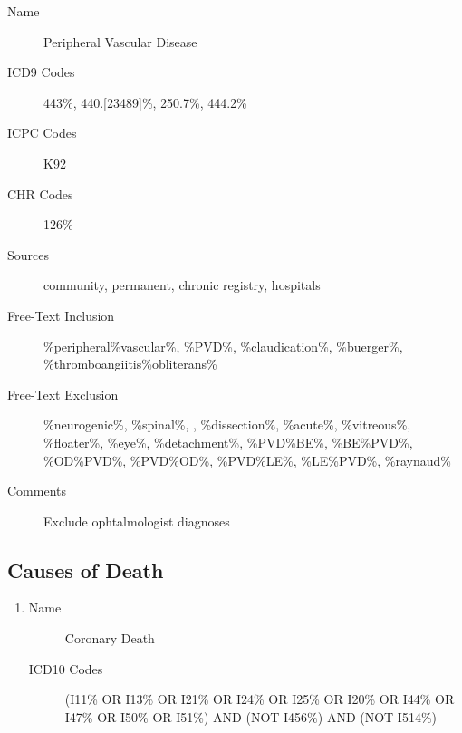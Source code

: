 \documentclass[a4paper,12pt]{article}
\begin{document}
\begin{appendices}
\begin{enumerate}
   					\begin{description}
   						\item[Name] Peripheral Vascular Disease
   						\item[ICD9 Codes] 443\%, 440.[23489]\%, 250.7\%, 444.2\%
   						\item[ICPC Codes] K92
   						\item[CHR Codes] 126\%
   						\item[Sources] community, permanent, chronic registry, hospitals
   						\item[Free-Text Inclusion] \%peripheral\%vascular\%, \%PVD\%, \%claudication\%, \%buerger\%, \%thromboangiitis\%obliterans\%
   						\item[Free-Text Exclusion] \%neurogenic\%, \%spinal\%, , \%dissection\%, \%acute\%, \%vitreous\%, \%floater\%, \%eye\%, \%detachment\%, \%PVD\%BE\%, \%BE\%PVD\%, \%OD\%PVD\%, \%PVD\%OD\%, \%PVD\%LE\%, \%LE\%PVD\%, \%raynaud\%
   						\item[Comments] Exclude ophtalmologist diagnoses
   					\end{description}
	   			\end{enumerate}
   			
   			\subsection{Causes of Death}
   				\begin{enumerate}
   					\item
   					\begin{description}
   						\item[Name] Coronary Death
   						\item[ICD10 Codes] (I11\% OR I13\% OR I21\% OR I24\% OR I25\% OR I20\% OR I44\% OR I47\% OR I50\% OR I51\%) AND (NOT I456\%) AND (NOT I514\%)
   					\end{description}
   				\end{enumerate}
	   			             

\end{appendices}
\end{document}
